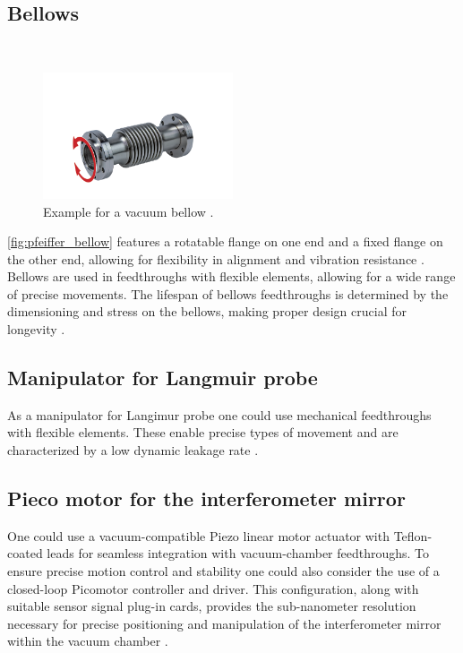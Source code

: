 \subsection{Bellows}
\
\begin{figure}[H]
    \centering
    \includegraphics[width=0.5\textwidth]{sections/imges/ports/bellows.png}
    \caption{Example for a vacuum bellow \cite{pfeiffer_bellows}.}
    \label{fig:pfeiffer_bellow}
\end{figure}

\autoref{fig:pfeiffer_bellow} features a rotatable flange on one end and a fixed flange on the other end, allowing for flexibility in alignment and vibration resistance \cite{pfeiffer_bellows}.
Bellows are used in feedthroughs with flexible elements, allowing for a wide range of precise movements.
The lifespan of bellows feedthroughs is determined by the dimensioning and stress on the bellows, making proper design crucial for longevity \cite{jousten_handbuch_2018}.


\subsection{Manipulator for Langmuir probe}

As a manipulator for Langimur probe one could use mechanical feedthroughs with flexible elements. These enable precise types of movement and are characterized by a low dynamic leakage rate \cite{jousten_handbuch_2018}.

\subsection{Pieco motor for the interferometer mirror}

One could use a vacuum-compatible Piezo linear motor actuator with Teflon-coated leads for seamless integration with vacuum-chamber feedthroughs.
To ensure precise motion control and stability one could also consider the use of a closed-loop Picomotor controller and driver.
This configuration, along with suitable sensor signal plug-in cards, provides the sub-nanometer resolution necessary for precise positioning and manipulation of the interferometer mirror within the vacuum chamber \cite{pie, piez0}.


